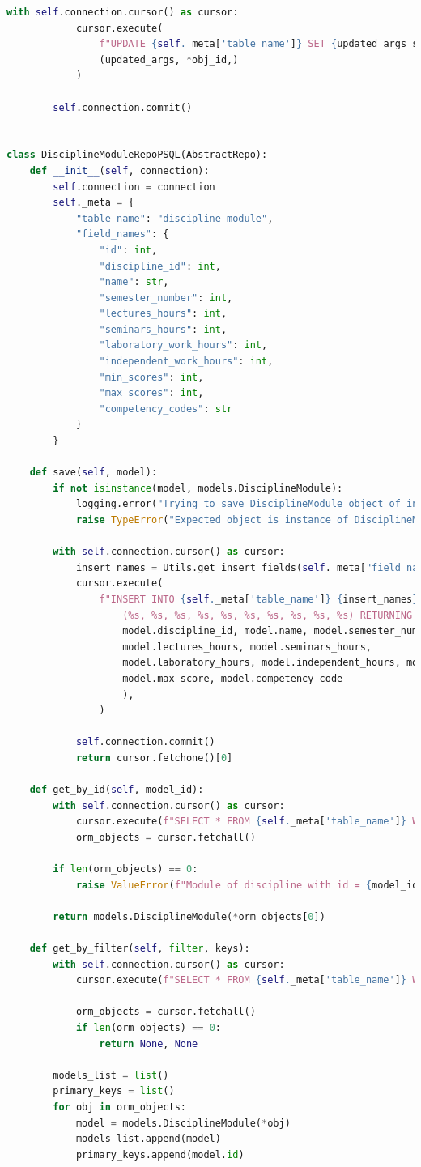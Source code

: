 \begin{lstlisting}[label=lst:db-postgresql, caption=Листинг модуля взаимодействия c СУБД PostgreSQL, language=python]
		with self.connection.cursor() as cursor:
			cursor.execute(
				f"UPDATE {self._meta['table_name']} SET {updated_args_str} WHERE id = %s",
				(updated_args, *obj_id,)
			)
		
		self.connection.commit()


class DisciplineModuleRepoPSQL(AbstractRepo):
	def __init__(self, connection):
		self.connection = connection
		self._meta = {
			"table_name": "discipline_module",
			"field_names": {
				"id": int,
				"discipline_id": int,
				"name": str,
				"semester_number": int,
				"lectures_hours": int,
				"seminars_hours": int,
				"laboratory_work_hours": int,
				"independent_work_hours": int,
				"min_scores": int,
				"max_scores": int,
				"competency_codes": str
			}
		}
	
	def save(self, model):
		if not isinstance(model, models.DisciplineModule):
			logging.error("Trying to save DisciplineModule object of invalid type")
			raise TypeError("Expected object is instance of DisciplineModule")
		
		with self.connection.cursor() as cursor:
			insert_names = Utils.get_insert_fields(self._meta["field_names"])
			cursor.execute(
				f"INSERT INTO {self._meta['table_name']} {insert_names} VALUES \
					(%s, %s, %s, %s, %s, %s, %s, %s, %s, %s) RETURNING id", (
					model.discipline_id, model.name, model.semester_number,
					model.lectures_hours, model.seminars_hours,
					model.laboratory_hours, model.independent_hours, model.min_score,
					model.max_score, model.competency_code
					),
				)
		
			self.connection.commit()
			return cursor.fetchone()[0]
	
	def get_by_id(self, model_id):
		with self.connection.cursor() as cursor:
			cursor.execute(f"SELECT * FROM {self._meta['table_name']} WHERE id = %s", (model_id,))
			orm_objects = cursor.fetchall()
		
		if len(orm_objects) == 0:
			raise ValueError(f"Module of discipline with id = {model_id} doesn't exists")
		
		return models.DisciplineModule(*orm_objects[0])
	
	def get_by_filter(self, filter, keys):
		with self.connection.cursor() as cursor:
			cursor.execute(f"SELECT * FROM {self._meta['table_name']} WHERE {filter}", keys)
		
			orm_objects = cursor.fetchall()
			if len(orm_objects) == 0:
				return None, None
		
		models_list = list()
		primary_keys = list()
		for obj in orm_objects:
			model = models.DisciplineModule(*obj)
			models_list.append(model)
			primary_keys.append(model.id)
		

\end{lstlisting}
